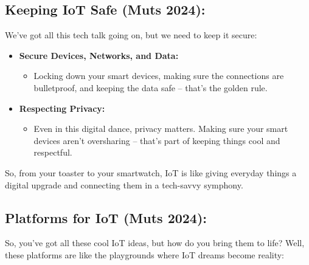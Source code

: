 \documentclass[
  letterpaper,
  DIV=11,
  numbers=noendperiod]{scrreprt}
\providecommand{\tightlist}{%
  \setlength{\itemsep}{0pt}\setlength{\parskip}{0pt}}\usepackage{longtable,booktabs,array}
\begin{document}
\subsection{Keeping IoT Safe (Muts
2024):}\label{keeping-iot-safe-muts2024iot}

We've got all this tech talk going on, but we need to keep it secure:

\begin{itemize}
\item
  \textbf{Secure Devices, Networks, and Data:}

  \begin{itemize}
  \tightlist
  \item
    Locking down your smart devices, making sure the connections are
    bulletproof, and keeping the data safe -- that's the golden rule.
  \end{itemize}
\item
  \textbf{Respecting Privacy:}

  \begin{itemize}
  \tightlist
  \item
    Even in this digital dance, privacy matters. Making sure your smart
    devices aren't oversharing -- that's part of keeping things cool and
    respectful.
  \end{itemize}
\end{itemize}

So, from your toaster to your smartwatch, IoT is like giving everyday
things a digital upgrade and connecting them in a tech-savvy symphony.

\subsection{Platforms for IoT (Muts
2024):}\label{platforms-for-iot-muts2024iot}

So, you've got all these cool IoT ideas, but how do you bring them to
life? Well, these platforms are like the playgrounds where IoT dreams
become reality:
\end{document}
